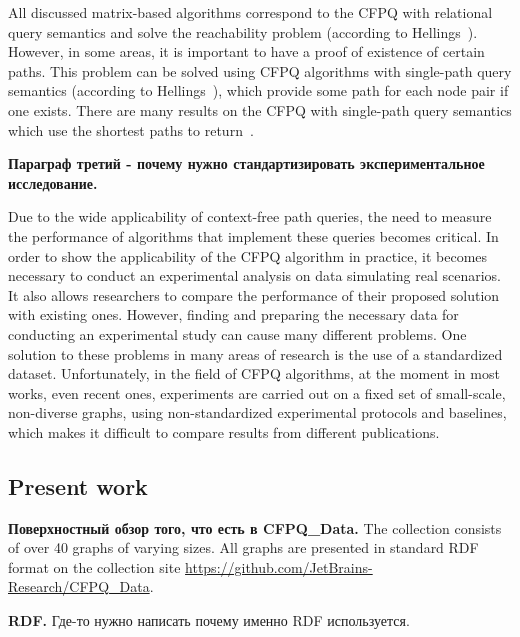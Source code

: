 All discussed matrix-based algorithms correspond to the CFPQ with relational query semantics and solve the reachability problem (according to Hellings~\cite{hellingsRelational}). 
However, in some areas, it is important to have a proof of existence of certain paths. 
This problem can be solved using CFPQ algorithms with single-path query semantics (according to Hellings~\cite{hellingsPathQuerying}), which provide some path for each node pair if one exists. 
There are many results on the CFPQ with single-path query semantics which use the shortest paths to return~\cite{hellingsPathQuerying,barrett2000formal,bradford2007quickest,ward2010complexity}.

\textbf{Параграф третий - почему нужно стандартизировать экспериментальное исследование.}

Due to the wide applicability of context-free path queries, the need to measure the performance of algorithms that implement these queries becomes critical. 
In order to show the applicability of the CFPQ algorithm in practice, it becomes necessary to conduct an experimental analysis on data simulating real scenarios. 
It also allows researchers to compare the performance of their proposed solution with existing ones.
However, finding and preparing the necessary data for conducting an experimental study can cause many different problems.
One solution to these problems in many areas of research is the use of a standardized dataset.
Unfortunately, in the field of CFPQ algorithms, at the moment in most works, even recent ones, experiments are carried out on a fixed set of small-scale, non-diverse graphs, using non-standardized experimental protocols and baselines, which makes it difficult to compare results from different publications.

\subsection{Present work}
\textbf{Поверхностный обзор того, что есть в CFPQ\_Data.}
The collection consists of over 40 graphs of varying sizes.
All graphs are presented in standard RDF format on the collection site \href{https://github.com/JetBrains-Research/CFPQ_Data}{https://github.com/JetBrains-Research/CFPQ\_Data}.

\textbf{RDF.} Где-то нужно написать почему именно RDF используется. 

